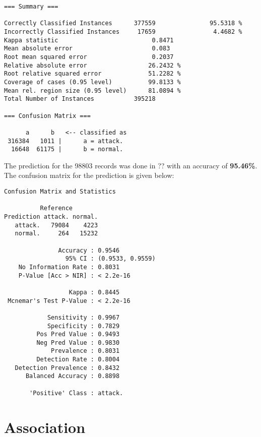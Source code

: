 \documentclass[11pt]{article}
\begin{document}
\begin{Verbatim}[fontsize=\small]
=== Summary ===

Correctly Classified Instances      377559               95.5318 %
Incorrectly Classified Instances     17659                4.4682 %
Kappa statistic                          0.8471
Mean absolute error                      0.083 
Root mean squared error                  0.2037
Relative absolute error                 26.2432 %
Root relative squared error             51.2282 %
Coverage of cases (0.95 level)          99.8133 %
Mean rel. region size (0.95 level)      81.0894 %
Total Number of Instances           395218     

=== Confusion Matrix ===

      a      b   <-- classified as
 316384   1011 |      a = attack.
  16648  61175 |      b = normal.
\end{Verbatim}

The prediction for the 98803 records was done in ?? with an accuracy of {\bf 95.46\%}. The confusion matrix for the prediction is given below:

\begin{Verbatim}[fontsize=\small]
Confusion Matrix and Statistics

          Reference
Prediction attack. normal.
   attack.   79084    4223
   normal.     264   15232
                                          
               Accuracy : 0.9546          
                 95% CI : (0.9533, 0.9559)
    No Information Rate : 0.8031          
    P-Value [Acc > NIR] : < 2.2e-16       
                                          
                  Kappa : 0.8445          
 Mcnemar's Test P-Value : < 2.2e-16       
                                          
            Sensitivity : 0.9967          
            Specificity : 0.7829          
         Pos Pred Value : 0.9493          
         Neg Pred Value : 0.9830          
             Prevalence : 0.8031          
         Detection Rate : 0.8004          
   Detection Prevalence : 0.8432          
      Balanced Accuracy : 0.8898          
                                          
       'Positive' Class : attack.  
\end{Verbatim}      

\section{Association}
\end{document}
